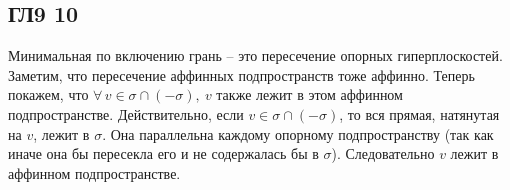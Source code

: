 \subsection*{ГЛ9 10}
Минимальная по включению грань -- это пересечение опорных гиперплоскостей. Заметим, что пересечение аффинных подпространств тоже аффинно. 
\vskip 0.2in
\noindent
Теперь покажем, что $\forall \, v \in \sigma \cap(-\sigma), \ v$ также лежит в этом аффинном подпространстве. Действительно, если $v \in \sigma \cap(-\sigma)$, то вся прямая, натянутая на $v$, лежит в $\sigma$. Она параллельна каждому опорному подпространству (так как иначе она бы пересекла его и не содержалась бы в $\sigma$). Следовательно $v$ лежит в аффинном подпространстве.
		